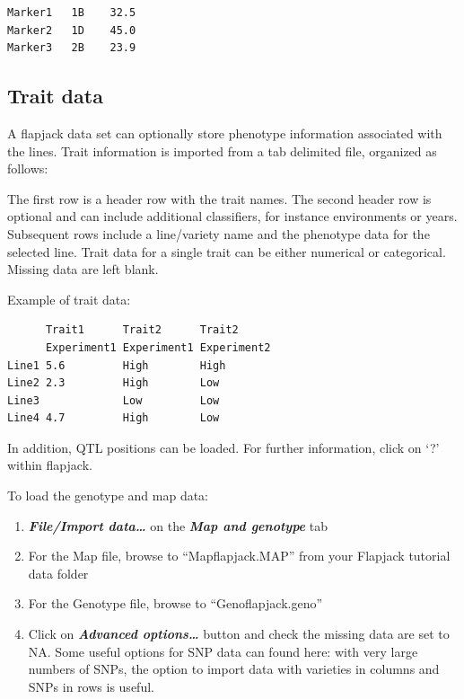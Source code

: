 \documentclass[
]{book}
\providecommand{\tightlist}{%
  \setlength{\itemsep}{0pt}\setlength{\parskip}{0pt}}
\begin{document}
\begin{verbatim}
Marker1   1B    32.5
Marker2   1D    45.0
Marker3   2B    23.9
\end{verbatim}

\hypertarget{trait-data}{%
\subsection{Trait data}\label{trait-data}}

A flapjack data set can optionally store phenotype information associated with the lines. Trait information is imported from a tab delimited file, organized as follows:

The first row is a header row with the trait names. The second header row is optional and can include additional classifiers, for instance environments or years. Subsequent rows include a line/variety name and the phenotype data for the selected line. Trait data for a single trait can be either numerical or categorical. Missing data are left blank.

Example of trait data:

\begin{verbatim}
      Trait1      Trait2      Trait2
      Experiment1 Experiment1 Experiment2
Line1 5.6         High        High
Line2 2.3         High        Low
Line3             Low         Low
Line4 4.7         High        Low
\end{verbatim}

In addition, QTL positions can be loaded. For further information, click on `?' within flapjack.

To load the genotype and map data:

\begin{enumerate}
\def\labelenumi{\arabic{enumi}.}
\tightlist
\item
  \textbf{\emph{File/Import data\ldots{}}} on the \textbf{\emph{Map and genotype}} tab
\item
  For the Map file, browse to ``Mapflapjack.MAP'' from your Flapjack tutorial data folder
\item
  For the Genotype file, browse to ``Genoflapjack.geno''
\item
  Click on \textbf{\emph{Advanced options\ldots{}}} button and check the missing data are set to NA. Some useful options for SNP data can found here: with very large numbers of SNPs, the option to import data with varieties in columns and SNPs in rows is useful.
\end{enumerate}
\end{document}
